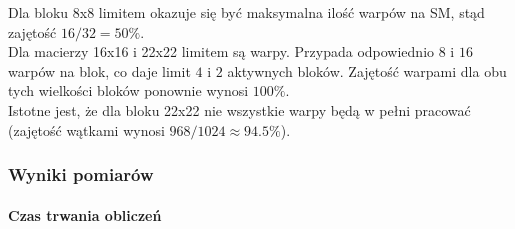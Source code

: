 Dla bloku 8x8 limitem okazuje się być maksymalna ilość warpów na SM, stąd zajętość $ 16 / 32 = 50\% $.\\
Dla macierzy 16x16 i 22x22 limitem są warpy. Przypada odpowiednio $ 8 $ i $ 16 $ warpów na blok, co daje limit $ 4 $ i $ 2 $ aktywnych bloków. Zajętość warpami dla obu tych wielkości bloków ponownie wynosi $ 100\% $.\\
Istotne jest, że dla bloku 22x22 nie wszystkie warpy będą w pełni pracować (zajętość wątkami wynosi $ 968 / 1024 \approx 94.5\% $).

\subsubsection{Wyniki pomiarów}

\paragraph{Czas trwania obliczeń}

